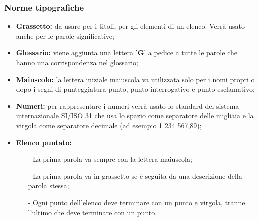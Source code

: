 \documentclass[a4paper,11pt]{article}
\begin{document}
			\subsubsection{Norme tipografiche}
				\begin{itemize}
				\item \textbf{Grassetto:} da usare per i titoli, per gli elementi di un elenco. Verrà usato anche per le parole significative;
				\item \textbf{Glossario:} viene aggiunta una lettera '\textbf{G}' a pedice a tutte le parole che hanno una corrispondenza nel glossario;
				\end{itemize}
				\begin{itemize}
				\item \textbf{Maiuscolo:} la lettera iniziale maiuscola va utilizzata solo per i nomi propri o dopo i segni di punteggiatura punto, punto interrogativo e punto esclamativo;
				\item \textbf{Numeri:} per rappresentare i numeri verrà usato lo standard del sistema internazionale SI/ISO 31 che usa lo spazio come separatore delle migliaia e la virgola come separatore decimale (ad esempio 1 234 567,89); 
				\end{itemize}
				\begin{itemize}
				\item \textbf{Elenco puntato:}
					\begin{itemize}
					\item[-] La prima parola va sempre con la lettera maiuscola;
					\item[-] La prima parola va in grassetto se è seguita da una descrizione della parola stessa;
					\item[-] Ogni punto dell'elenco deve terminare con un punto e virgola, tranne l'ultimo che deve terminare con un punto.
					\end{itemize}
				\end{itemize}
					
\end{document}
